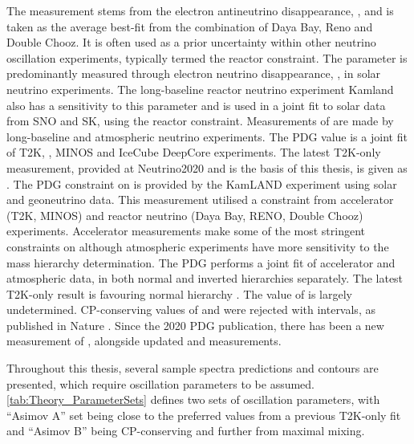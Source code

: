 The  measurement stems from the electron antineutrino disappearance, , and is taken as the  average best-fit from the combination of Daya Bay, Reno and Double Chooz. It is often used as a prior uncertainty within other neutrino oscillation experiments, typically termed the reactor constraint. The  parameter is predominantly measured through electron neutrino disappearance, , in solar neutrino experiments. The long-baseline reactor neutrino experiment Kamland also has a sensitivity to this parameter and is used in a joint fit to solar data from SNO and SK, using the reactor constraint. Measurements of  are made by long-baseline and atmospheric neutrino experiments. The PDG value is a joint fit of T2K, , MINOS and IceCube DeepCore experiments. The latest T2K-only measurement, provided at Neutrino2020 and is the basis of this thesis, is given as  \cite{Dunne2020-uf}. The PDG constraint on  is provided by the KamLAND experiment using solar and geoneutrino data. This measurement utilised a  constraint from accelerator (T2K, MINOS) and reactor neutrino (Daya Bay, RENO, Double Chooz) experiments. Accelerator measurements make some of the most stringent constraints on  although atmospheric experiments have more sensitivity to the mass hierarchy determination. The PDG performs a joint fit of accelerator and atmospheric data, in both normal and inverted hierarchies separately. The latest T2K-only result is  favouring normal hierarchy \cite{Dunne2020-uf}. The value of  is largely undetermined. CP-conserving values of  and \quickmath{\pi} were rejected with \quickmath{\sim 2\sigma} intervals, as published in Nature \cite{Nature2020}.
Since the 2020 PDG publication, there has been a new measurement of  \cite{Workman:2022ynf}, alongside updated  and  measurements.

Throughout this thesis, several sample spectra predictions and contours are presented, which require oscillation parameters to be assumed. \autoref{tab:Theory_ParameterSets} defines two sets of oscillation parameters, with ``Asimov A'' set being close to the preferred values from a previous T2K-only fit \cite{PhysRevLett.112.181801} and ``Asimov B'' being CP-conserving and further from maximal  mixing.

